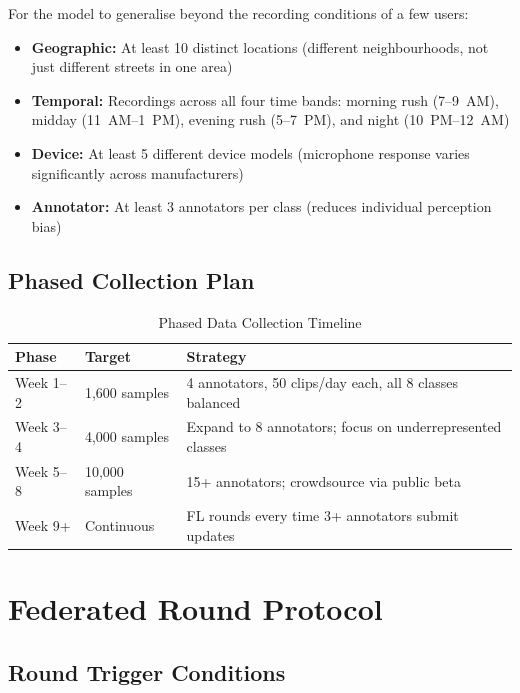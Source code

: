 \documentclass[11pt,a4paper]{article}
\begin{document}
For the model to generalise beyond the recording conditions of a few users:

\begin{itemize}[leftmargin=*,noitemsep]
  \item \textbf{Geographic:} At least 10 distinct locations (different neighbourhoods,
        not just different streets in one area)
  \item \textbf{Temporal:} Recordings across all four time bands: morning rush (7--9~AM),
        midday (11~AM--1~PM), evening rush (5--7~PM), and night (10~PM--12~AM)
  \item \textbf{Device:} At least 5 different device models (microphone response
        varies significantly across manufacturers)
  \item \textbf{Annotator:} At least 3 annotators per class (reduces individual
        perception bias)
\end{itemize}

\subsection{Phased Collection Plan}

\begin{table}[h]
\centering
\caption{Phased Data Collection Timeline}
\begin{tabular}{@{}p{2.5cm}p{2.5cm}p{7cm}@{}}
\toprule
\textbf{Phase} & \textbf{Target} & \textbf{Strategy} \\
\midrule
Week 1--2  & 1,600 samples  & 4 annotators, 50 clips/day each, all 8 classes balanced \\
Week 3--4  & 4,000 samples  & Expand to 8 annotators; focus on underrepresented classes \\
Week 5--8  & 10,000 samples & 15+ annotators; crowdsource via public beta \\
Week 9+    & Continuous     & FL rounds every time 3+ annotators submit updates \\
\bottomrule
\end{tabular}
\end{table}

\section{Federated Round Protocol}

\subsection{Round Trigger Conditions}
\end{document}
